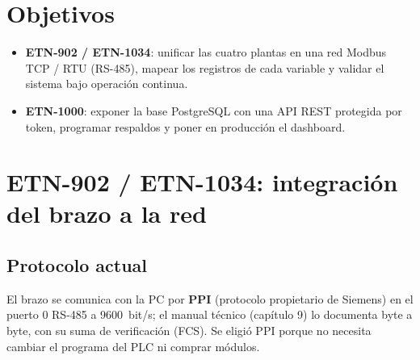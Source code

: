 \documentclass[a4paper,11pt]{article}
\begin{document}

\tableofcontents
\newpage


\section{Objetivos}
\begin{itemize}
\item \textbf{ETN-902 / ETN-1034}: unificar las cuatro plantas en una red Modbus TCP / RTU (RS-485), mapear los registros de cada variable y validar el sistema bajo operación continua.
\item \textbf{ETN-1000}: exponer la base PostgreSQL con una API REST protegida por token, programar respaldos y poner en producción el dashboard.
\end{itemize}

\section{ETN-902 / ETN-1034: integración del brazo a la red}
\subsection{Protocolo actual}
El brazo se comunica con la PC por \textbf{PPI} (protocolo propietario de Siemens) en el puerto 0 RS-485 a 9600~bit/s; el manual técnico (capítulo 9) lo documenta byte a byte, con su suma de verificación (FCS). Se eligió PPI porque no necesita cambiar el programa del PLC ni comprar módulos.
\end{document}
